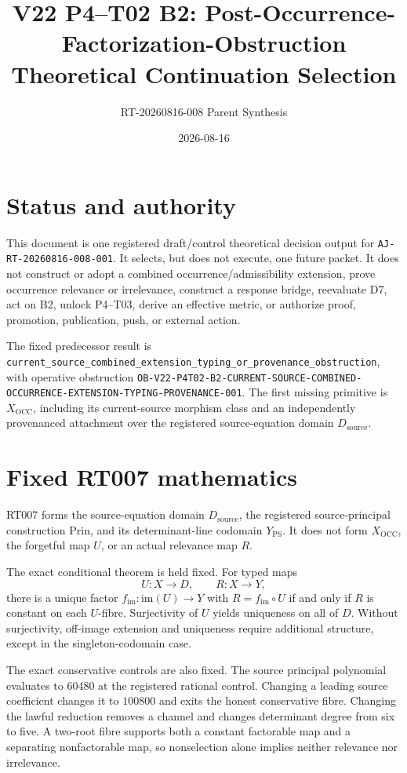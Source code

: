 \documentclass[11pt]{article}
\title{V22 P4--T02 B2: Post-Occurrence-Factorization-Obstruction\\Theoretical Continuation Selection}
\author{RT-20260816-008 Parent Synthesis}
\date{2026-08-16}
\newcommand{\code}[1]{\nolinkurl{#1}}
\begin{document}
\maketitle

\section*{Status and authority}

This document is one registered draft/control theoretical decision output for
\code{AJ-RT-20260816-008-001}.  It selects, but does not execute, one future
packet.  It does not construct or adopt a combined occurrence/admissibility
extension, prove occurrence relevance or irrelevance, construct a response
bridge, reevaluate D7, act on B2, unlock P4--T03, derive an effective metric,
or authorize proof, promotion, publication, push, or external action.

The fixed predecessor result is
\code{current_source_combined_extension_typing_or_provenance_obstruction},
with operative obstruction
\code{OB-V22-P4T02-B2-CURRENT-SOURCE-COMBINED-OCCURRENCE-EXTENSION-TYPING-PROVENANCE-001}.
The first missing primitive is $X_{\mathrm{OCC}}$, including its current-source
morphism class and an independently provenanced attachment over the registered
source-equation domain $D_{\mathrm{source}}$.

\section{Fixed RT007 mathematics}

RT007 forms the source-equation domain $D_{\mathrm{source}}$, the registered
source-principal construction $\mathrm{Prin}$, and its determinant-line codomain
$Y_{\mathrm{PS}}$.  It does not form $X_{\mathrm{OCC}}$, the forgetful map $U$,
or an actual relevance map $R$.

The exact conditional theorem is held fixed.  For typed maps
\[
  U:X\longrightarrow D,\qquad R:X\longrightarrow Y,
\]
there is a unique factor $f_{\mathrm{im}}:\mathrm{im}(U)\to Y$ with
$R=f_{\mathrm{im}}\circ U$ if and only if $R$ is constant on each $U$-fibre.
Surjectivity of $U$ yields uniqueness on all of $D$.  Without surjectivity,
off-image extension and uniqueness require additional structure, except in the
singleton-codomain case.

The exact conservative controls are also fixed.  The source principal
polynomial evaluates to $60480$ at the registered rational control.  Changing
a leading source coefficient changes it to $100800$ and exits the honest
conservative fibre.  Changing the lawful reduction removes a channel and
changes determinant degree from six to five.  A two-root fibre supports both a
constant factorable map and a separating nonfactorable map, so nonselection
alone implies neither relevance nor irrelevance.
\end{document}
